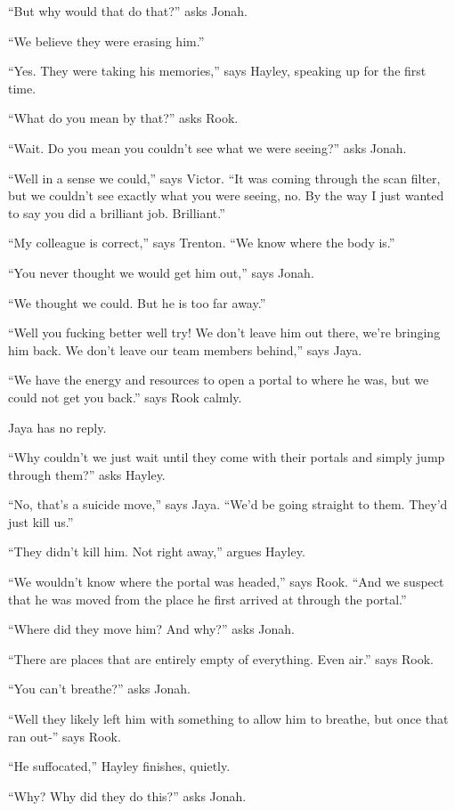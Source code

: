 ``But why would that do that?'' asks Jonah.

``We believe they were erasing him.''

``Yes.  They were taking his memories,'' says Hayley, speaking up for the first time. 

``What do you mean by that?'' asks Rook.

``Wait.  Do you mean you couldn't see what we were seeing?'' asks Jonah.

``Well in a sense we could,'' says Victor.  ``It was coming through the scan filter, but we couldn't see exactly what you were seeing, no.  By the way I just wanted to say you did a brilliant job.  Brilliant.''

``My colleague is correct,'' says Trenton.  ``We know where the body is.''

``You never thought we would get him out,'' says Jonah.

``We thought we could. But he is too far away.''

``Well you fucking better well try!  We don't leave him out there, we're bringing him back.  We don't leave our team members behind,'' says Jaya.

``We have the energy and resources to open a portal to where he was, but we could not get you back.'' says Rook calmly.

Jaya has no reply.

``Why couldn't we just wait until they come with their portals and simply jump through them?'' asks Hayley.

``No, that's a suicide move,'' says Jaya.  ``We'd be going straight to them.  They'd just kill us.''

``They didn't kill him.  Not right away,'' argues Hayley.

``We wouldn't know where the portal was headed,'' says Rook.  ``And we suspect that he was moved from the place he first arrived at through the portal.''

``Where did they move him?  And why?'' asks Jonah.

``There are places that are entirely empty of everything.  Even air.'' says Rook.

``You can't breathe?'' asks Jonah.

``Well they likely left him with something to allow him to breathe, but once that ran out-'' says Rook.

``He suffocated,'' Hayley finishes, quietly.

``Why?  Why did they do this?'' asks Jonah.


